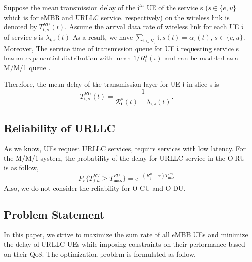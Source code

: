 \documentclass[conference]{IEEEtran}
\begin{document}
Suppose the mean transmission delay of the $\mathfrak{i}^{th}$ UE of the service s ($s \in \{e,u\}$which is for eMBB and URLLC service, respectively) on the wireless link is denoted by
$T_{\mathfrak{i},s}^{RU}(t)$.
 Assume the arrival data rate of wireless link for each UE $\mathfrak{i}$ of service s is $\lambda_{\mathfrak{i},s}(t)$
As a result, we have $\sum_{\mathfrak{i} \in \mathcal{U}_s} {\mathfrak{i},s}(t) = \alpha_s(t)$, $s \in \{e,u\}$.
Moreover, The service time of transmission queue for UE $\mathfrak{i}$ requesting service s has
an exponential distribution with mean $1/R_{\mathfrak{i}}^s(t)$ and can be modeled as a M/M/1 queue \cite{SystemCostMinimization,luong2018joint,luong2018novel}.
 
Therefore, the mean delay of the transmission layer for UE $\mathfrak{i}$ in slice s is
\begin{equation}
 T_{\mathfrak{i},s}^{RU}(t) = \frac{1}{{\mathcal{R}}_{\mathfrak{i}}^s(t) - \lambda_{\mathfrak{i},s}(t)}.
\end{equation}


\subsection{Reliability of URLLC}
As we know, UEs request URLLC services, require services with low latency.
For the M/M/1 system, the probability of the delay for URLLC service in the O-RU is as follow, 
\begin{equation}
P_r\{T_{j,u}^{RU} \geq T^{RU}_{\text{max}}\} = e^{-({R}_{j}^u - \alpha)T^{RU}_{\text{max}}}
\end{equation} 
Also, we do not consider the reliability for O-CU and O-DU.

\subsection{Problem Statement}
In this paper, we strive to maximize the sum rate of all eMBB UEs and minimize the delay of URLLC UEs while imposing constraints on their performance based on their QoS.
The optimization problem is formulated as follow,
\end{document}
